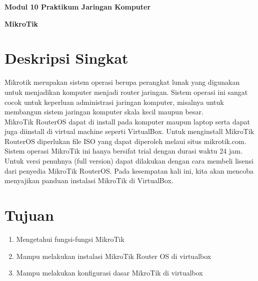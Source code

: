 \documentclass{article}
\begin{document}
    \begin{center}
        \textbf{Modul 10 Praktikum Jaringan Komputer}

        \textbf{MikroTik}
    \end{center}

    \section*{Deskripsi Singkat}
    \hspace{\parindent} Mikrotik merupakan sistem operasi berupa perangkat lunak yang 
    digunakan untuk menjadikan komputer menjadi router jaringan. 
    Sistem operasi ini sangat cocok untuk keperluan administrasi 
    jaringan komputer, misalnya untuk membangun sistem jaringan komputer 
    skala kecil maupun besar.\\

    MikroTik RouterOS dapat di install pada komputer maupun laptop serta 
    dapat juga diinstall di virtual machine seperti VirtualBox. 
    Untuk menginstall MikroTik RouterOS diperlukan file ISO yang dapat diperoleh 
    melaui situs mikrotik.com. Sistem operasi MikroTik ini hanya bersifat 
    trial dengan durasi waktu 24 jam. Untuk versi penuhnya (full version) 
    dapat dilakukan dengan cara membeli lisensi dari penyedia MikroTik RouterOS. 
    Pada kesempatan kali ini, kita akan mencoba menyajikan panduan instalasi 
    MikroTik di VirtualBox.


    \section*{Tujuan}
    \begin{enumerate}
        \item Mengetahui fungsi-fungsi MikroTik 
        \item Mampu melakukan instalasi MikroTik Router OS di virtualbox 
        \item Mampu melakukan konfigurasi dasar MikroTik di virtualbox
        \newline 
    \end{enumerate}


\end{document}
